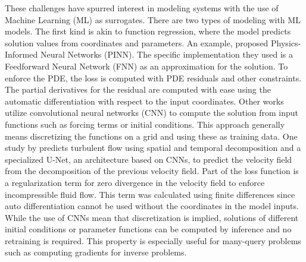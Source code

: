 \documentclass[preprint,12pt,times,authoryear]{elsarticle}
\begin{document}
These challenges have spurred interest in modeling systems with the use of Machine Learning (ML) as surrogates. There are two types of modeling with ML models. The first kind is akin to function regression, where the model predicts solution values from coordinates and parameters. An example, \citet{raissiPhysicsinformedNeuralNetworks2019} proposed Physics-Informed Neural Networks (PINN). The specific implementation they used is a Feedforward Neural Network (FNN) as an approximation for the solution.  To enforce the PDE, the loss is computed with PDE residuals and other constraints. The partial derivatives for the residual are computed with ease using the automatic differentiation with respect to the input coordinates. Other works utilize convolutional neural networks (CNN) to compute the solution from input functions such as forcing terms or initial conditions. This approach generally means discretizing the functions on a grid and using these as training data. One study by \citet{wangPhysicsinformedDeepLearning2020} predicts turbulent flow using spatial and temporal decomposition and a specialized U-Net, an architecture based on CNNs, to predict the velocity field from the decomposition of the previous velocity field. Part of the loss function is a regularization term for zero divergence in the velocity field to enforce incompressible fluid flow. This term was calculated using finite differences since auto differentiation cannot be used without the coordinates in the model inputs. While the use of CNNs mean that discretization is implied, solutions of different initial conditions or parameter functions can be computed by inference and no retraining is required. This property is especially useful for many-query problems such as computing gradients for inverse problems.
\end{document}

